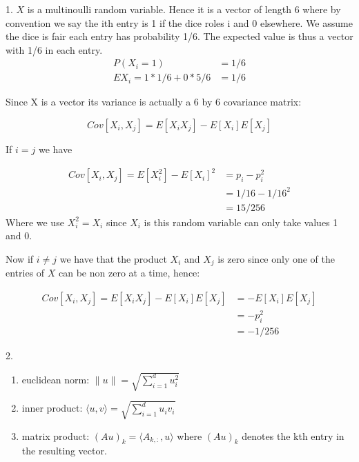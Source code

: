 \clearpage

1. $X$ is a multinoulli random variable. Hence it is a vector of 
length 6 where by convention we say the ith entry is 1 if the dice
roles i and 0 elsewhere. We assume the dice is fair each entry has
probability 1/6. The expected value is thus a vector with 1/6 in
each entry. 
\begin{align}
	P (X_i = 1) &= 1/6\\
	E X_i = 1*1/6 + 0*5/6 &= 1/6
\end{align}

Since X is a vector its variance is actually a 6 by 6 covariance matrix:

\begin{equation}
  Cov[X_i,X_j] = E[X_i X_j] - E[X_i]E[X_j]
\end{equation}

If $i=j$ we have

\begin{align}
  Cov [X_i ,X_j] = E[X_{i}^{2}] - {E[X_{i}]}^{2} &= p_{i}-p_{i}^{2}\\
                                               &= 1/16 - 1/16^2\\
                                               &= 15/256
\end{align}
Where we use $X_{i}^{2} = X_{i}$ since $X_{i}$ is this random variable can only take
values 1 and 0.

Now if $i \neq j$ we have that the product $X_{i}$ and $X_{j}$ is zero since
only one of the entries of $X$ can be non zero at a time, hence:

\begin{align}
  Cov [X_i ,X_j] = E[X_{i} X_{j}] - E[X_i] E[X_j] &= -E[X_i]E[X_j]\\
                                                  &= -p_i ^ 2 \\
                                                  &= -1/256
\end{align}


\clearpage

2.

\begin{enumerate}
  \item euclidean norm:
    $\| u \| =\sqrt{\sum_{i=1}^{d} u_{i}^{2}} $
  \item inner product:
    $\langle u, v \rangle = \sqrt{\sum_{i=1}^{d} u_{i}v_{i}}$
  \item matrix product:
    $(Au)_k = \langle A_{k,:} , u \rangle $
    where $(Au)_k $ denotes the kth entry in the resulting vector.

\end{enumerate}

